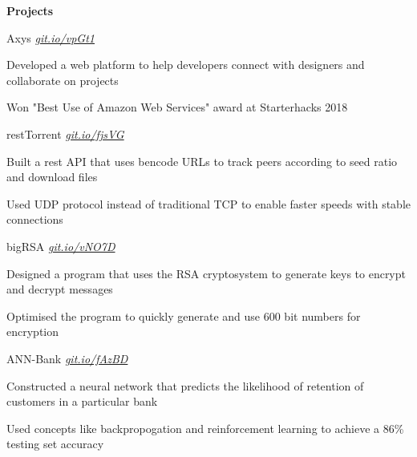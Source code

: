 \documentclass{resume} %
\begin{document}
\begin{rSection}{\textbf{Projects}}
  
  \begin{rSubsection}{Axys}
	  {\em {\href{https://github.com/MSJawad/AXYS}
		    {git.io/vpGt1}}}
	  {}

    \item Developed a web platform to help developers connect with designers and collaborate on projects
    \item Won "Best Use of Amazon Web Services" award at Starterhacks 2018
      
  \end{rSubsection}

	\begin{rSubsection}{restTorrent}
		{\em {\href{https://github.com/MSJawad/restTorrent}
				{git.io/fjsVG}}}
		{}
		
		\item Built a rest API that uses bencode URLs to track peers according to seed ratio and download files
		\item Used UDP protocol instead of traditional TCP to enable faster speeds with stable connections
		
	\end{rSubsection}

  \begin{rSubsection}{bigRSA}
	  {\em {\href{https://github.com/MSJawad/bigRSA}
		    {git.io/vNO7D}}}
	  {}

    \item Designed a program that uses the RSA cryptosystem to generate keys to encrypt and decrypt messages
    \item Optimised the program to quickly generate and use 600 bit numbers for encryption
    
    \end{rSubsection}
    
   \begin{rSubsection}{ANN-Bank}
	  {\em {\href{https://github.com/MSJawad/ANN-Bank-Solutions}
		    {git.io/fAzBD}}}
	  {}

    \item Constructed a neural network that predicts the likelihood of retention of customers in a particular bank
    \item Used concepts like backpropogation and reinforcement learning to achieve a 86\% testing set accuracy
   

\end{rSubsection}
\end{rSection}
\end{document}
